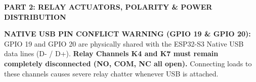\documentclass[11pt,a4paper]{article}
\begin{document}
\newpage


\begin{center}
  {\large\bfseries PART 2: RELAY ACTUATORS, POLARITY \& POWER DISTRIBUTION}
\end{center}
\vspace{-8pt}

\begin{tcolorbox}[bwalert]
\textbf{NATIVE USB PIN CONFLICT WARNING (GPIO 19 \& GPIO 20):}
GPIO 19 and GPIO 20 are physically shared with the ESP32-S3 Native USB data lines (D- / D+). \textbf{Relay Channels K4 and K7 must remain completely disconnected (NO, COM, NC all open).} Connecting loads to these channels causes severe relay chatter whenever USB is attached.
\end{tcolorbox}

\vspace{-4pt}
\end{document}
